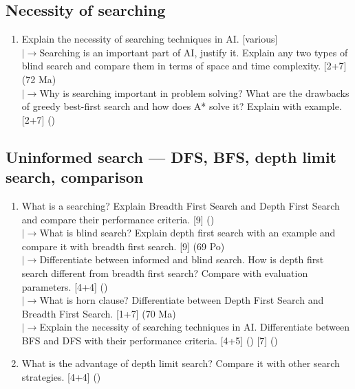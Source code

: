 \documentclass[12pt]{article}
\newcommand{\lb}{\\$\left|\rightarrow\right.$}
\begin{document}
  \subsection{Necessity of searching}
    \begin{enumerate}[topsep=0pt, noitemsep]
      \item Explain the necessity of searching techniques in AI. \hfill [various]
        \lb Searching is an important part of AI, justify it. Explain any two types of blind search and compare them in terms of space and time complexity. \hfill [2+7] (72 Ma)
        \lb Why is searching important in problem solving? What are the drawbacks of greedy best-first search and how does A* solve it? Explain with example. \hfill [2+7] ()
    \end{enumerate}

  \subsection{Uninformed search --- DFS, BFS, depth limit search, comparison}
    \begin{enumerate}[topsep=0pt, noitemsep]
      \item What is a searching? Explain Breadth First Search and Depth First Search and compare their performance criteria. \hfill [9] ()
        \lb What is blind search? Explain depth first search with an example and compare it with breadth first search. \hfill [9] (69 Po)
        \lb Differentiate between informed and blind search. How is depth first search different from breadth first search? Compare with evaluation parameters. \hfill [4+4] ()
        \lb What is horn clause? Differentiate between Depth First Search and Breadth First Search. \hfill [1+7] (70 Ma)
        \lb Explain the necessity of searching techniques in AI. Differentiate between BFS and DFS with their performance criteria. \hfill [4+5] () [7] ()

      \item What is the advantage of depth limit search? Compare it with other search strategies. \hfill [4+4] ()
    \end{enumerate}
\end{document}
